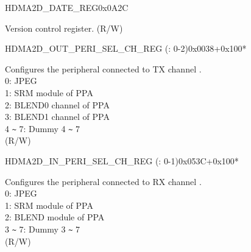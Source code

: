 \begin{register}{H}{DMA2D\_DATE\_REG}{0x0A2C}\label{regdesc:DMA2DDATEREG}
%
\regnewline%
\begin{regdesc}\begin{reglist}
\label{fielddesc:DMA2DDATE}\item [DMA2D\_DATE] Version control register. (R/W)
\end{reglist}\end{regdesc}
\end{register}


\begin{register}{H}{DMA2D\_OUT\_PERI\_SEL\_CH\_REG (: 0-2)}{0x0038+0x100*}\label{regdesc:DMA2DOUTPERISELCHNREG}
%
%
\regnewline%
\begin{regdesc}\begin{reglist}
\label{fielddesc:DMA2DOUTPERISELCHN}\item [DMA2D\_OUT\_PERI\_SEL\_CH\regindex{n}] Configures the peripheral connected to TX channel .\\
0: JPEG\\
1: SRM module of PPA\\
2: BLEND0 channel of PPA\\
3: BLEND1 channel of PPA\\
4 \verb+~+ 7: Dummy 4 \verb+~+ 7\\ (R/W)
\end{reglist}\end{regdesc}
\end{register}


\begin{register}{H}{DMA2D\_IN\_PERI\_SEL\_CH\_REG (: 0-1)}{0x053C+0x100*}\label{regdesc:DMA2DINPERISELCHNREG}
%
%
\regnewline%
\begin{regdesc}\begin{reglist}
\label{fielddesc:DMA2DINPERISELCHN}\item [DMA2D\_IN\_PERI\_SEL\_CH\regindex{n}] Configures the peripheral connected to RX channel .\\
0: JPEG\\
1: SRM module of PPA\\
2: BLEND module of PPA\\
3 \verb+~+ 7: Dummy 3 \verb+~+ 7\\ (R/W)
\end{reglist}\end{regdesc}
\end{register}
